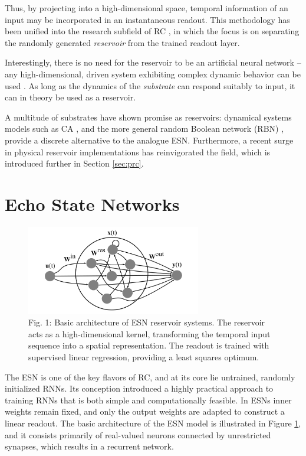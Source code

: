Thus, by projecting into a high-dimensional space, temporal information of an
input may be incorporated in an instantaneous readout. This methodology has been
unified into the research subfield of RC \cite{schrauwen_overview_2007}, in
which the focus is on separating the randomly generated \textit{reservoir} from
the trained readout layer.

Interestingly, there is no need for the reservoir to be an artificial neural
network -- any high-dimensional, driven system exhibiting complex dynamic
behavior can be used \cite{schrauwen_overview_2007}. As long as the dynamics of
the \textit{substrate} can respond suitably to input, it can in theory be used
as a reservoir.

A multitude of substrates have shown promise as reservoirs: dynamical systems
models such as CA \cite{yilmaz_reservoir_2014}, and the more general random
Boolean network (RBN) \cite{snyder_computational_2013}, provide a discrete
alternative to the analogue ESN. Furthermore, a recent surge in physical
reservoir implementations has reinvigorated the field, which is introduced
further in Section \ref{sec:prc}.

\section{Echo State Networks}

\begin{figure}[t!]
  \centering
  \includegraphics[width=3.0in]{figures/esn.png}
  \caption{
    Fig. 1: Basic architecture of ESN reservoir systems. The reservoir acts as a
high-dimensional kernel, transforming the temporal input sequence into a spatial
representation. The readout is trained with supervised linear regression,
providing a least squares optimum.
  }
  \label{fig:esn}
\end{figure}

The ESN is one of the key flavors of RC, and at its core lie untrained, randomly
initialized RNNs. Its conception introduced a highly practical approach to
training RNNs that is both simple and computationally feasible. In ESNs inner
weights remain fixed, and only the output weights are adapted to construct a
linear readout. The basic architecture of the ESN model is illustrated in Figure
\ref{fig:esn}, and it consists primarily of real-valued neurons connected by
unrestricted synapses, which results in a recurrent network.

